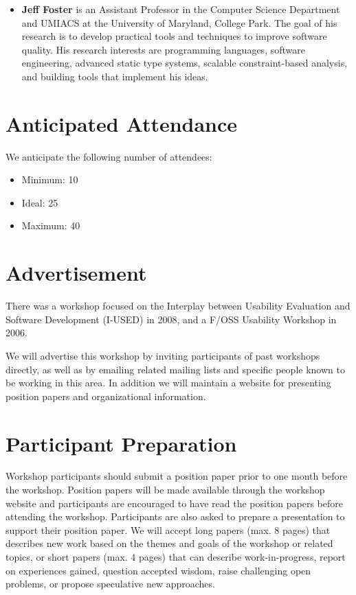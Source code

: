 \documentclass{acm_proc_article-sp}
\begin{document}
\begin{itemize}
\item \textbf{Jeff Foster} is an Assistant Professor in the Computer Science Department and UMIACS at the University of Maryland, College Park. The goal of his research is to develop practical tools and techniques to improve software quality. His research interests are programming languages, software engineering, advanced static type systems, scalable constraint-based analysis, and building tools that implement his ideas.

\end{itemize}

\section{Anticipated Attendance}

We anticipate the following number of attendees:

\begin{itemize}
\item Minimum: 10 
\item Ideal: 25 
\item Maximum: 40 
\end{itemize}

\section{Advertisement}

There was a workshop focused on the Interplay between Usability Evaluation and Software Development (I-USED) in 2008, and a F/OSS Usability Workshop in 2006.

We will advertise this workshop by inviting participants of past workshops directly, as well as by emailing related mailing lists and specific people known to be working in this area. In addition we will maintain a website for presenting position papers and organizational information. 

\section{Participant Preparation}

Workshop participants should submit a position paper prior to one month before the 
workshop. Position papers will be made available through the workshop website and 
participants are encouraged to have read the position papers before attending the 
workshop. Participants are also asked to prepare a presentation to support their position paper. 
We will accept long papers (max. 8 pages) that describes new work based on the themes and goals of the workshop or related topics, or short papers (max. 4 pages) that can describe work-in-progress, report on experiences gained, question accepted wisdom, raise challenging open problems, or propose speculative new approaches.
\end{document}
